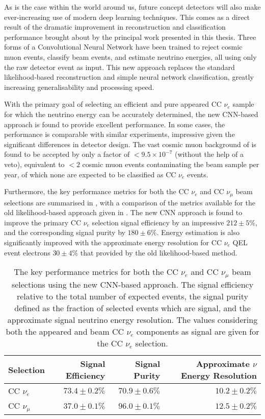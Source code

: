 As is the case within the world around us, future \chips concept detectors will also make
ever-increasing use of modern deep learning techniques. This comes as a direct result of the
dramatic improvement in \chipsfive reconstruction and classification performance brought about by
the principal work presented in this thesis. Three forms of a Convolutional Neural Network have
been trained to reject cosmic muon events, classify beam events, and estimate neutrino energies,
all using only the raw detector event as input. This new approach replaces the standard
likelihood-based reconstruction and simple neural network classification, greatly increasing
generalisability and processing speed.

With the primary goal of selecting an efficient and pure appeared CC $\nu_{e}$ sample for which
the neutrino energy can be accurately determined, the new CNN-based approach is found to provide
excellent performance. In some cases, the performance is comparable with similar experiments,
impressive given the significant differences in detector design. The vast cosmic muon background
of \chipsfive is found to be accepted by only a factor of $<9.5\times10^{-7}$ (without the help of
a veto), equivalent to $<2$ cosmic muon events contaminating the beam sample per year, of which
none are expected to be classified as CC $\nu_{e}$ events. 

Furthermore, the key performance metrics for both the CC $\nu_{e}$ and CC $\nu_{\mu}$ beam
selections are summarised in , with a comparison of the metrics
available for the old likelihood-based approach given in . The new
CNN approach is found to improve the primary CC $\nu_{e}$ selection signal efficiency by an
impressive $212\pm5\%$, and the corresponding signal purity by $180\pm6\%$. Energy estimation is
also significantly improved with the approximate energy resolution for CC $\nu_{e}$ QEL event
electrons $30\pm4\%$ that provided by the old likelihood-based method.

\begin{table}
    \begin{tabular}{lrrr}
        Selection           & Signal Efficiency & Signal Purity & Approximate $\nu$ Energy Resolution \\
        \midrule
        CC $\nu_{e}$     & $73.4\pm0.2\%$ & $70.9\pm0.6\%$ & $10.2\pm0.2\%$ \\
        CC $\nu_{\mu}$   & $37.0\pm0.1\%$ & $96.0\pm0.1\%$ & $12.5\pm0.2\%$ \\
    \end{tabular}
    \caption[Key performance metrics of the new CNN approach]
    {The key performance metrics for both the CC $\nu_{e}$ and CC $\nu_{\mu}$ beam selections
        using the new CNN-based approach. The signal efficiency relative to the total number of
        expected events, the signal purity defined as the fraction of selected events which are
        signal, and the approximate signal neutrino energy resolution. The values considering both
        the appeared and beam CC $\nu_{e}$ components as signal are given for the CC $\nu_{e}$
        selection.}
    \label{tab:final_metrics}
\end{table}

